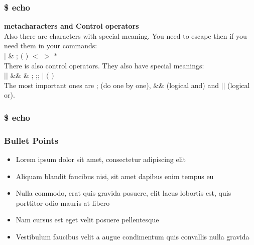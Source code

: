 \documentclass{beamer}
\begin{document}
\begin{frame}\frametitle{\$ echo}
{\bf metacharacters and Control operators}\\
Also there are characters with special meaning. You need to escape then if you need them in your commands:\\
$|$ \& ; $($ $)$ $<$ $>$ $*$ \\
There is also control operators. They also have special meanings:\\
$||$ \&\& \& ; ;; $|$ $($ $)$ \\
The most important ones are ; (do one by one), \&\& (logical and) and $||$ (logical or). 
\end{frame}

\begin{frame}\frametitle{\$ echo}
 \par
\vspace{0.15cm}
 \par
\vspace{0.15cm}
\end{frame}


\begin{frame}
\frametitle{Bullet Points}
\begin{itemize}
\item Lorem ipsum dolor sit amet, consectetur adipiscing elit
\item Aliquam blandit faucibus nisi, sit amet dapibus enim tempus eu
\item Nulla commodo, erat quis gravida posuere, elit lacus lobortis est, quis porttitor odio mauris at libero
\item Nam cursus est eget velit posuere pellentesque
\item Vestibulum faucibus velit a augue condimentum quis convallis nulla gravida
\end{itemize}
\end{frame}

\end{document}
